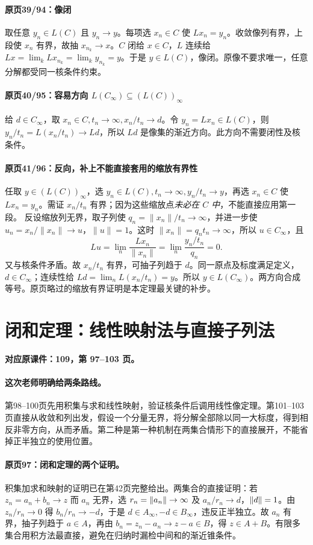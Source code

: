 \paragraph{原页39/94：像闭}
取任意 $y_n\in L(C)$ 且 $y_n\to y$。每项选 $x_n\in C$ 使 $Lx_n=y_n$。收敛像列有界，上段使 $x_n$ 有界，故抽 $x_{n_k}\to x$。$C$ 闭给 $x\in C$，$L$ 连续给 $Lx=\lim_kLx_{n_k}=\lim_ky_{n_k}=y$。于是 $y\in L(C)$，像闭。原像不要求唯一，任意分解都受同一核条件约束。
\paragraph{原页40/95：容易方向 $L(C_\infty)\subseteq(L(C))_\infty$}
给 $d\in C_\infty$，取 $x_n\in C,t_n\to\infty,x_n/t_n\to d$。令 $y_n=Lx_n\in L(C)$，则 $y_n/t_n=L(x_n/t_n)\to Ld$，所以 $Ld$ 是像集的渐近方向。此方向不需要闭性及核条件。
\paragraph{原页41/96：反向，补上不能直接套用的缩放有界性}
任取 $y\in(L(C))_\infty$，选 $y_n\in L(C),t_n\to\infty,y_n/t_n\to y$，再选 $x_n\in C$ 使 $Lx_n=y_n$。需证 $x_n/t_n$ 有界；因为这些缩放点\emph{未必在 $C$ 中}，不能直接应用第一段。
反设缩放列无界，取子列使 $q_n=\|x_n\|/t_n\to\infty$，并进一步使 $u_n=x_n/\|x_n\|\to u$，$\|u\|=1$。这时 $\|x_n\|=q_nt_n\to\infty$，所以 $u\in C_\infty$，且
\[Lu=\lim_n\frac{Lx_n}{\|x_n\|}=\lim_n\frac{y_n/t_n}{q_n}=0.\]
又与核条件矛盾。故 $x_n/t_n$ 有界，可抽子列趋于 $d$。同一原点及标度满足定义，$d\in C_\infty$；连续性给 $Ld=\lim_nL(x_n/t_n)=y$。所以 $y\in L(C_\infty)$。两方向合成等号。原页略过的缩放有界证明是本定理最关键的补步。


\clearpage\section{闭和定理：线性映射法与直接子列法}\label{g:109:97}

\textbf{对应原课件：109，第 97--103 页。}


\paragraph{这次老师明确给两条路线。}
第98--100页先用积集与求和线性映射，验证核条件后调用线性像定理。第101--103页直接从收敛和列出发，假设一个分量无界，将分解全部除以同一大标度，得到相反非零方向，从而矛盾。第二种是第一种机制在两集合情形下的直接展开，不能省掉正半独立的使用位置。


\paragraph{原页97：闭和定理的两个证明。}积集加求和映射的证明已在第42页完整给出。两集合的直接证明：若 $z_n=a_n+b_n\to z$ 而 $a_n$ 无界，选 $r_n=\left\lVert a_n\right\rVert\to\infty$ 及 $a_n/r_n\to d$，$\left\lVert d\right\rVert=1$。由 $z_n/r_n\to0$ 得 $b_n/r_n\to-d$，于是 $d\in A_\infty,-d\in B_\infty$，违反正半独立。故 $a_n$ 有界，抽子列趋于 $a\in A$，再由 $b_n=z_n-a_n\to z-a\in B$，得 $z\in A+B$。有限多集合用积方法最直接，避免在归纳时漏检中间和的渐近锥条件。



